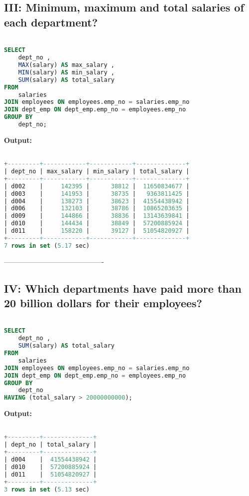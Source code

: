 \documentclass[12pt]{report}
\begin{document}
\subsection*{III: Minimum, maximum and total salaries of each department?}

\begin{lstlisting}[language=sql]

SELECT
	dept_no ,
	MAX(salary) AS max_salary ,
	MIN(salary) AS min_salary ,
	SUM(salary) AS total_salary
FROM
	salaries
JOIN employees ON employees.emp_no = salaries.emp_no
JOIN dept_emp ON dept_emp.emp_no = employees.emp_no
GROUP BY
	dept_no;
\end{lstlisting}
\textbf{Output:}

\begin{lstlisting}[language=sql]

+---------+------------+------------+--------------+
| dept_no | max_salary | min_salary | total_salary |
+---------+------------+------------+--------------+
| d002    |     142395 |      38812 |  11650834677 |
| d003    |     141953 |      38735 |   9363811425 |
| d004    |     138273 |      38623 |  41554438942 |
| d006    |     132103 |      38786 |  10865203635 |
| d009    |     144866 |      38836 |  13143639841 |
| d010    |     144434 |      38849 |  57200885924 |
| d011    |     158220 |      39127 |  51054820927 |
+---------+------------+------------+--------------+
7 rows in set (5.17 sec)

\end{lstlisting}

-------------------------------------------

\subsection*{IV: Which departments have paid more than 20 billion dollars for their employees?}
\begin{lstlisting}[language=sql]

SELECT
	dept_no ,
	SUM(salary) AS total_salary
FROM
	salaries
JOIN employees ON employees.emp_no = salaries.emp_no
JOIN dept_emp ON dept_emp.emp_no = employees.emp_no
GROUP BY
	dept_no
HAVING (total_salary > 20000000000);

\end{lstlisting}

\textbf{Output:}

\begin{lstlisting}[language=sql]

+---------+--------------+
| dept_no | total_salary |
+---------+--------------+
| d004    |  41554438942 |
| d010    |  57200885924 |
| d011    |  51054820927 |
+---------+--------------+
3 rows in set (5.13 sec)


\end{lstlisting}
\end{document}
